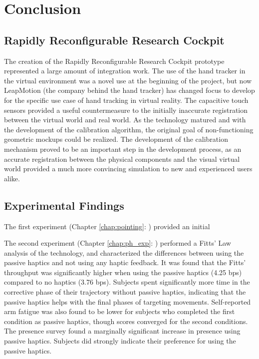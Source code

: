 \chapter{Conclusion}
\label{chap:conclusion}

\section{Rapidly Reconfigurable Research Cockpit}

The creation of the Rapidly Reconfigurable Research Cockpit prototype represented a large amount of integration work.
The use of the hand tracker in the virtual environment was a novel use at the beginning of the project, but now LeapMotion (the company behind the hand tracker) has changed focus to develop for the specific use case of hand tracking in virtual reality.
The capacitive touch sensors provided a useful countermeasure to the initially inaccurate registration between the virtual world and real world.
As the technology matured and with the development of the calibration algorithm, the original goal of non-functioning geometric mockups could be realized.
The development of the calibration mechanism proved to be an important step in the development process, as an accurate registration between the physical components and the visual virtual world provided a much more convincing simulation to new and experienced users alike.

\section{Experimental Findings}

The first experiment (Chapter \ref{chap:pointing}: ) provided an initial 

The second experiment (Chapter \ref{chap:ph_exp}: ) performed a Fitts' Law analysis of the technology, and characterized the differences between using the passive haptics and not using any haptic feedback.
It was found that the Fitts' throughput was significantly higher when using the passive haptics (4.25 bps) compared to no haptics (3.76 bps).
Subjects spent significantly more time in the corrective phase of their trajectory without passive haptics, indicating that the passive haptics helps with the final phases of targeting movements.
Self-reported arm fatigue was also found to be lower for subjects who completed the first condition as passive haptics, though scores converged for the second conditions.
The presence survey found a marginally significant increase in presence using passive haptics.
Subjects did strongly indicate their preference for using the passive haptics.

